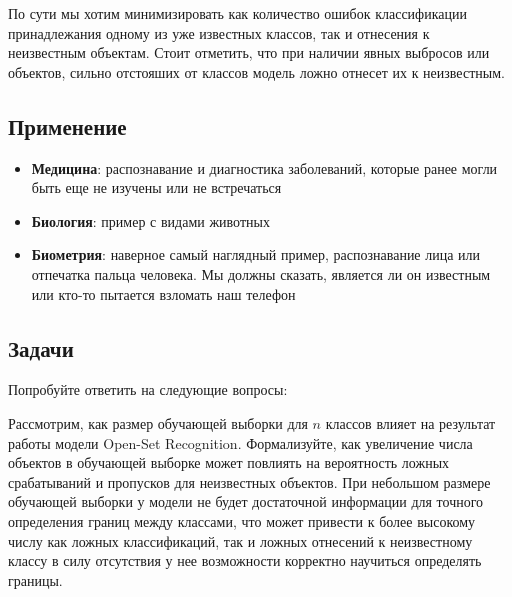 По сути мы хотим минимизировать как количество ошибок классификации принадлежания одному из уже известных классов, так и отнесения к неизвестным объектам.
Стоит отметить, что при наличии явных выбросов или объектов, сильно отстояших от классов модель ложно отнесет их к неизвестным.

\subsection{Применение}
\begin{itemize}
    \item \textbf{Медицина}: распознавание и диагностика заболеваний, которые ранее могли быть еще не изучены или не встречаться
    \item \textbf{Биология}: пример с видами животных
    \item \textbf{Биометрия}: наверное самый наглядный пример, распознавание лица или отпечатка пальца человека. Мы должны сказать, является ли он известным или кто-то пытается взломать наш телефон
\end{itemize}

\subsection{Задачи}
Попробуйте ответить на следующие вопросы:

\problem Рассмотрим, как размер обучающей выборки для $n$ классов влияет на результат работы модели Open-Set Recognition. 
Формализуйте, как увеличение числа объектов в обучающей выборке может повлиять на вероятность ложных срабатываний и пропусков для неизвестных объектов.
\solution При небольшом размере обучающей выборки у модели не будет достаточной информации для точного определения границ между классами, что может привести к более высокому числу как ложных классификаций, так и ложных отнесений к неизвестному классу в силу отсутствия у нее возможности корректно научиться определять границы.

